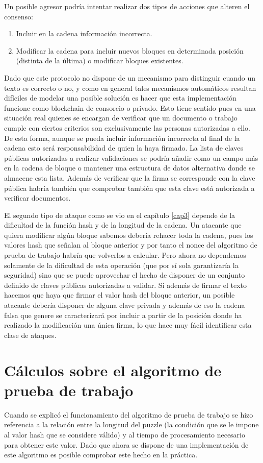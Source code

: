 Un posible agresor podría intentar realizar dos tipos de acciones que alteren el consenso:

\begin{enumerate}
\item Incluir en la cadena información incorrecta.  
\item Modificar la cadena para incluir nuevos bloques en determinada posición (distinta de la última) o modificar bloques existentes.
\end{enumerate}

Dado que este protocolo no dispone de un mecanismo para distinguir cuando un texto es correcto o no, y como en general tales mecanismos automáticos resultan difíciles de modelar una posible solución es hacer que esta implementación funcione como blockchain de consorcio o privado. Esto tiene sentido pues en una situación real quienes se encargan de verificar que un documento o trabajo cumple con ciertos criterios son exclusivamente las personas autorizadas a ello. De esta forma, aunque se pueda incluir información incorrecta al final de la cadena esto será responsabilidad de quien la haya firmado. La lista de claves públicas autorizadas a realizar validaciones se podría añadir como un campo más en la cadena de bloque o mantener una estructura de datos alternativa donde se almacene esta lista. Además de verificar que la firma se corresponde con la clave pública habría también que comprobar también que esta clave está autorizada a verificar documentos.

El segundo tipo de ataque como se vio en el capítulo \ref{cap3} depende de la dificultad de la función hash y de la longitud de la cadena. Un atacante que quiera modificar algún bloque sabemos debería rehacer toda la cadena, pues los valores hash que señalan al bloque anterior y por tanto el nonce del algoritmo de prueba de trabajo habría que volverlos a calcular. Pero ahora no dependemos solamente de la dificultad de esta operación (que por sí sola garantizaría la seguridad) sino que se puede aprovechar el hecho de disponer de un conjunto definido de claves públicas autorizadas a validar. Si además de firmar el texto hacemos que haya que firmar el valor hash del bloque anterior, un posible atacante debería disponer de alguna clave privada y además de eso la cadena falsa que genere se caracterizará por incluir a partir de la posición donde ha realizado la modificación una única firma, lo que hace muy fácil identificar esta clase de ataques.


\section{Cálculos sobre el algoritmo de prueba de trabajo}
Cuando se explicó el funcionamiento del algoritmo de prueba de trabajo se hizo referencia a la relación entre la longitud del puzzle (la condición que se le impone al valor hash que se considere válido) y al tiempo de procesamiento necesario para obtener este valor. Dado que ahora se dispone de una implementación de este algoritmo es posible comprobar este hecho en la práctica.

